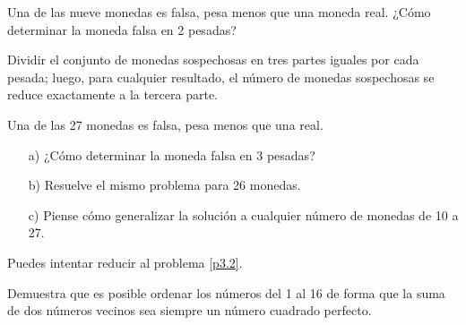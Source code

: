 \documentclass[11pt]{scrartcl}
\begin{document}
\begin{problem}\label{p3.2}
    Una de las nueve monedas es falsa, pesa menos que una moneda real. ¿Cómo determinar la moneda falsa en 2 pesadas?
    \begin{hint}
        Dividir el conjunto de monedas sospechosas en tres partes iguales por cada pesada; luego, para cualquier resultado, el número de monedas sospechosas se reduce exactamente a la tercera parte.
    \end{hint}
\end{problem}

\begin{problem}
Una de las 27 monedas es falsa, pesa menos que una real.
\begin{itemize}
\item[a)] ¿Cómo determinar la moneda falsa en 3 pesadas?
\item[b)] Resuelve el mismo problema para 26 monedas.
\item[c)] Piense cómo generalizar la solución a cualquier número de monedas de 10 a 27.
\end{itemize}
    \begin{hint}
        Puedes intentar reducir al problema \eqref{p3.2}.
\begin{comment}
(a) Colocamos 9 monedas en cada platillo. Para cualquier resultado de esta pesada, quedar´an
9 monedas sospechosas, y tendremos dos pesadas m´as a nuestra disposici´on. Esto ya lo
podemos resolver debido al problema 1
(b) Colocamos 9 monedas en cada platillo. En el caso del desequilibrio (que uno de los platillos
pese m´as que el otro), llegamos al problema 1 y, en el caso del equilibrio, solo quedan ocho
monedas sospechosas (las 18 colocadas en los platillos necesariamente son reales). A˜nadimos
cualquiera de las 18 monedas utilizadas en la primera pesada, y de nuevo reducimos
el problema al ya resuelto (el problema 1).
(c) Suponga que hay N monedas en total. Colocamos N
3  en cada platillo, reserve las restantes.
Si uno de los platillos pes´o m´as, entonces quedan N
3  monedas sospechosas, y en
el caso de equilibrio, quedan N − 2 N
3  monedas sospechosas. Dado que todas las dem´as
monedas deben ser reales, y el n´umero total de monedas es al menos diez, el conjunto de
monedas sospechosas puede complementarse con monedas reales hasta nueve y as´ı llegamos
al problema 1.
\end{comment}
\end{hint}
\end{problem}

\begin{problem}
    Demuestra que es posible ordenar los números del 1 al 16 de forma que la suma de dos números vecinos sea siempre un número cuadrado perfecto.
\end{problem}
\end{document}
